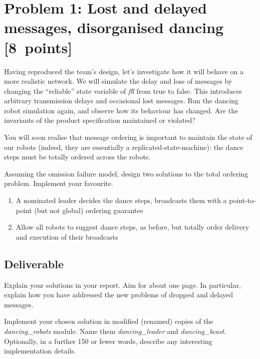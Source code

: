 \documentclass[a4paper]{article}
\begin{document}




\section*{Problem 1: Lost and delayed messages, disorganised dancing [8~points]} %
\label{sec:dealing_with_unreliable_links}

Having reproduced the team's design, let's investigate how it will behave on
a more realistic network. We will simulate the delay and loss of messages by
changing the ``reliable'' state variable of \emph{fll} from true to false.
This introduces arbitrary transmission delays and occasional lost messages.
Run the dancing robot  simulation again, and observe how its behaviour has
changed. Are the invariants of the product specification maintained or
violated?

You will soon realise that message ordering is important to maintain the state
of our robots (indeed, they are essentially a replicated-state-machine): the
dance steps must be totally ordered across the robots.

Assuming the omission failure model, design two solutions to the total
ordering problem. Implement your favourite.
\begin{enumerate}

  \item A nominated leader decides the dance steps, broadcasts them with a
  point-to-point (but not global) ordering guarantee

  \item Allow all robots to suggest dance steps, as before, but totally order
  delivery and execution of their broadcasts

\end{enumerate}



\subsection*{Deliverable} %
\label{sub:p1_deliverable}

Explain your solutions in your report. Aim for about one page.
In particular, explain how you have addressed the new
problems of dropped and delayed messages.

Implement your chosen solution in modified (renamed) copies of the
\emph{dancing\_robots} module. Name them \emph{dancing\_leader} and
\emph{dancing\_bcast}. Optionally, in a further 150 or fewer words, describe
any interesting implementation details.
\end{document}

